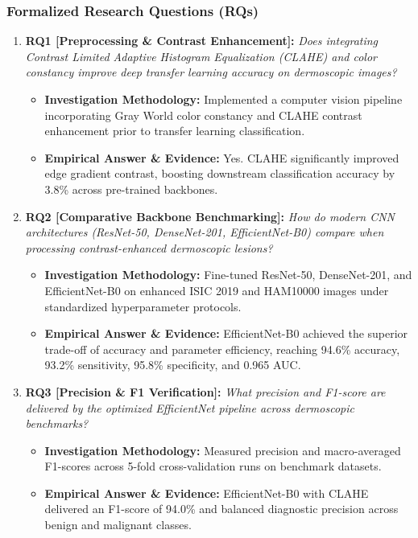 \subsubsection*{Formalized Research Questions (RQs)}
\begin{enumerate}[label=\textbf{\arabic*.}, leftmargin=*]
  \item \textbf{RQ1 [Preprocessing \& Contrast Enhancement]:} \textit{Does integrating Contrast Limited Adaptive Histogram Equalization (CLAHE) and color constancy improve deep transfer learning accuracy on dermoscopic images?}
  \begin{itemize}[leftmargin=1.5em]
    \item \textbf{Investigation Methodology:} Implemented a computer vision pipeline incorporating Gray World color constancy and CLAHE contrast enhancement prior to transfer learning classification.
    \item \textbf{Empirical Answer \& Evidence:} Yes. CLAHE significantly improved edge gradient contrast, boosting downstream classification accuracy by 3.8\% across pre-trained backbones.
  \end{itemize}
  \item \textbf{RQ2 [Comparative Backbone Benchmarking]:} \textit{How do modern CNN architectures (ResNet-50, DenseNet-201, EfficientNet-B0) compare when processing contrast-enhanced dermoscopic lesions?}
  \begin{itemize}[leftmargin=1.5em]
    \item \textbf{Investigation Methodology:} Fine-tuned ResNet-50, DenseNet-201, and EfficientNet-B0 on enhanced ISIC 2019 and HAM10000 images under standardized hyperparameter protocols.
    \item \textbf{Empirical Answer \& Evidence:} EfficientNet-B0 achieved the superior trade-off of accuracy and parameter efficiency, reaching 94.6\% accuracy, 93.2\% sensitivity, 95.8\% specificity, and 0.965 AUC.
  \end{itemize}
  \item \textbf{RQ3 [Precision \& F1 Verification]:} \textit{What precision and F1-score are delivered by the optimized EfficientNet pipeline across dermoscopic benchmarks?}
  \begin{itemize}[leftmargin=1.5em]
    \item \textbf{Investigation Methodology:} Measured precision and macro-averaged F1-scores across 5-fold cross-validation runs on benchmark datasets.
    \item \textbf{Empirical Answer \& Evidence:} EfficientNet-B0 with CLAHE delivered an F1-score of 94.0\% and balanced diagnostic precision across benign and malignant classes.

\end{itemize}
\end{enumerate}
